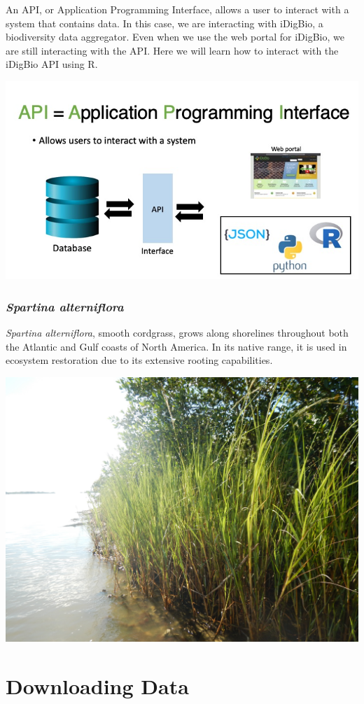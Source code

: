 \documentclass[
]{book}
\begin{document}
An API, or Application Programming Interface, allows a user to interact with a system that contains data. In this case, we are interacting with iDigBio, a biodiversity data aggregator. Even when we use the web portal for iDigBio, we are still interacting with the API. Here we will learn how to interact with the iDigBio API using R.

\begin{center}\includegraphics[width=0.7\linewidth]{img/API} \end{center}

\hypertarget{spartina-alterniflora}{%
\subsubsection{\texorpdfstring{\emph{Spartina alterniflora}}{Spartina alterniflora}}\label{spartina-alterniflora}}

\emph{Spartina alterniflora}, smooth cordgrass, grows along shorelines throughout both the Atlantic and Gulf coasts of North America. In its native range, it is used in ecosystem restoration due to its extensive rooting capabilities.

\begin{center}\includegraphics[width=0.5\linewidth]{img/spartina} \end{center}

\hypertarget{downloading-data}{%
\section{Downloading Data}\label{downloading-data}}
\end{document}
